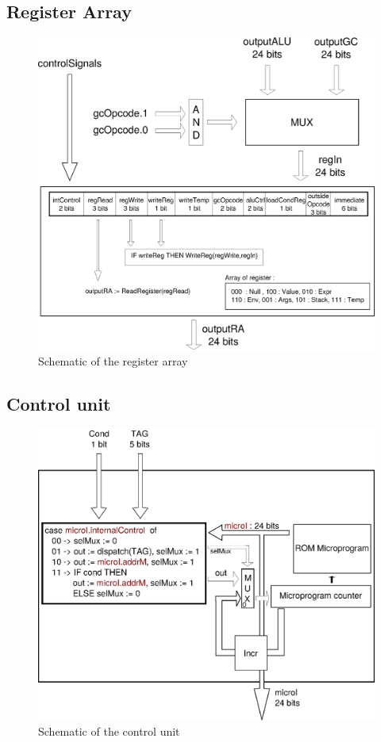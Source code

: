 \documentclass[a4paper, 11pt]{article}
\begin{document}
\subsection{Register Array}
\begin{figure}[h]
\center
\caption{Schematic of the register array}
   \includegraphics[scale=0.5]{RA.eps}
\end{figure}
\newpage
\subsection{Control unit}
\begin{figure}[h]
\center
\caption{Schematic of the control unit}
   \includegraphics[scale=0.5]{control.eps}
\end{figure}
\end{document}
